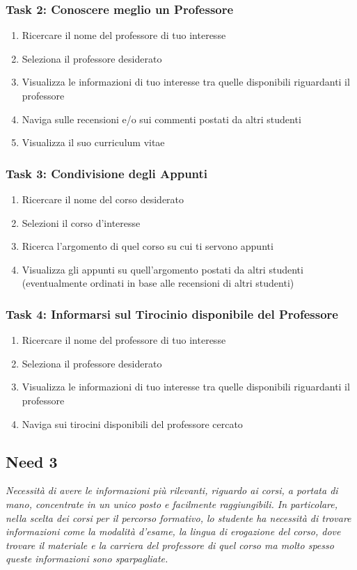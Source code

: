 \subsubsection{Task 2: Conoscere meglio un Professore}
\begin{enumerate}
    \item Ricercare il nome del professore di tuo interesse
    \item Seleziona il professore desiderato
    \item Visualizza le informazioni di tuo interesse tra quelle disponibili riguardanti il professore
    \item Naviga sulle recensioni e/o sui commenti postati da altri studenti 
    \item Visualizza il suo curriculum vitae 
\end{enumerate}


\subsubsection{Task 3: Condivisione degli Appunti}
\begin{enumerate}
    \item Ricercare il nome del corso desiderato
    \item Selezioni il corso d’interesse
    \item Ricerca l’argomento di quel corso su cui ti servono appunti
    \item Visualizza gli appunti su quell’argomento postati da altri studenti (eventualmente ordinati in base alle recensioni di altri studenti)  
\end{enumerate}

\subsubsection{Task 4: Informarsi sul Tirocinio disponibile del Professore}
\begin{enumerate}
    \item Ricercare il nome del professore di tuo interesse
    \item Seleziona il professore desiderato
    \item Visualizza le informazioni di tuo interesse tra quelle disponibili riguardanti il professore
    \item Naviga sui tirocini disponibili del professore cercato
\end{enumerate} 

\subsection{Need 3}
\begin{center}
    \textit{Necessità di avere le informazioni più rilevanti, riguardo ai corsi, a portata di mano, concentrate in un unico posto e facilmente raggiungibili.
    In particolare, nella scelta dei corsi per il percorso formativo, lo studente ha necessità di trovare informazioni come la modalità d’esame, la lingua di erogazione del corso, dove trovare il materiale e la carriera del professore di quel corso ma molto spesso queste informazioni sono sparpagliate.}
\end{center}
